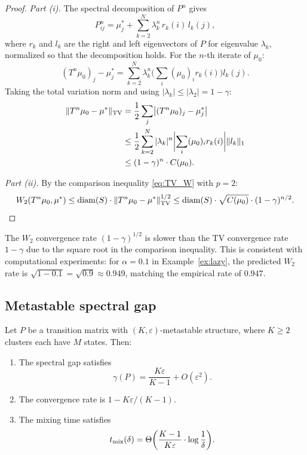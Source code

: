 \begin{proof}
\emph{Part (i).} The spectral decomposition of $P^n$ gives
\[
  P^n_{ij} = \mu^*_j + \sum_{k=2}^N \lambda_k^n \, r_k(i) \, l_k(j),
\]
where $r_k$ and $l_k$ are the right and left eigenvectors of $P$ for
eigenvalue $\lambda_k$, normalized so that the decomposition holds. For the
$n$-th iterate of $\mu_0$:
\[
  (T^n \mu_0)_j - \mu^*_j = \sum_{k=2}^N \lambda_k^n
  \biggl(\sum_i (\mu_0)_i r_k(i)\biggr) l_k(j).
\]
Taking the total variation norm and using $|\lambda_k| \le |\lambda_2| = 1 - \gamma$:
\begin{align*}
  \|T^n \mu_0 - \mu^*\|_{\mathrm{TV}}
  &= \frac{1}{2} \sum_j \bigl|(T^n \mu_0)_j - \mu^*_j\bigr| \\
  &\le \frac{1}{2} \sum_{k=2}^N |\lambda_k|^n
    \biggl|\sum_i (\mu_0)_i r_k(i)\biggr| \|l_k\|_1 \\
  &\le (1 - \gamma)^n \cdot C(\mu_0).
\end{align*}

\emph{Part (ii).} By the comparison inequality \eqref{eq:TV_W} with $p = 2$:
\[
  W_2(T^n \mu_0, \mu^*)
  \le \mathrm{diam}(S) \cdot \|T^n \mu_0 - \mu^*\|_{\mathrm{TV}}^{1/2}
  \le \mathrm{diam}(S) \cdot \sqrt{C(\mu_0)} \cdot (1 - \gamma)^{n/2}. \qedhere
\]
\end{proof}

\begin{remark}\label{rem:W2_rate}
The $W_2$ convergence rate $(1 - \gamma)^{1/2}$ is slower than the TV
convergence rate $1 - \gamma$ due to the square root in the comparison
inequality. This is consistent with computational experiments: for
$\alpha = 0.1$ in Example~\ref{ex:lazy}, the predicted $W_2$ rate is
$\sqrt{1 - 0.1} = \sqrt{0.9} \approx 0.949$, matching the empirical rate of
$0.947$.
\end{remark}

\subsection{Metastable spectral gap}

\begin{theorem}\label{thm:metastable}
Let $P$ be a transition matrix with $(K, \varepsilon)$-metastable structure,
where $K \ge 2$ clusters each have $M$ states. Then:
\begin{enumerate}[label=(\roman*)]
\item The spectral gap satisfies
  \begin{equation}\label{eq:meta_gap}
    \gamma(P) = \frac{K\varepsilon}{K - 1} + O(\varepsilon^2).
  \end{equation}
\item The convergence rate is $1 - K\varepsilon/(K-1)$.
\item The mixing time satisfies
  \begin{equation}\label{eq:meta_mix}
    t_{\operatorname{mix}}(\delta) = \Theta\biggl(\frac{K - 1}{K\varepsilon}
    \cdot \log \frac{1}{\delta}\biggr).
  \end{equation}
\end{enumerate}
\end{theorem}

